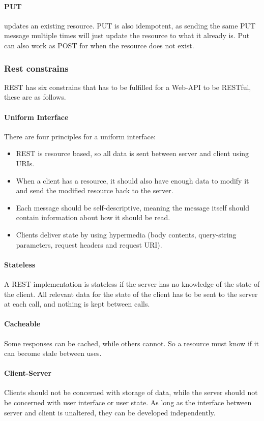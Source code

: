 \paragraph{PUT} updates an existing resource. PUT is also idempotent, as sending the same PUT message multiple times will just update the resource to what it already is. Put can also work as POST for when the resource does not exist.

\subsubsection{Rest constrains}
REST has six constrains that has to be fulfilled for a Web-API to be RESTful, these are as follows.

\paragraph{Uniform Interface}  There are four principles for a uniform interface:
\begin{itemize}
\item REST is resource based, so all data is sent between server and client using URIs.
\item When a client has a resource, it should also have enough data to modify it and send the modified resource back to the server.
\item Each message should be self-descriptive, meaning the message itself should contain information about how it should be read.
\item Clients deliver state by using hypermedia (body contents, query-string parameters, request headers and request URI).
\end{itemize}

\paragraph{Stateless} A REST implementation is stateless if the server has no knowledge of the state of the client. All relevant data for the state of the client has to be sent to the server at each call, and nothing is kept between calls.

\paragraph{Cacheable} Some responses can be cached, while others cannot. So a resource must know if it can become stale between uses.

\paragraph{Client-Server} Clients should not be concerned with storage of data, while the server should not be concerned with user interface or user state. As long as the interface between server and client is unaltered, they can be developed independently.

